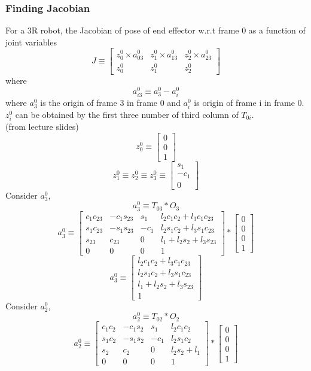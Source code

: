\documentclass[12pt]{article}
\newcommand{\fromlectures}{{\\ \color{blue} \hspace*{\fill}(from lecture slides)} \\}
\begin{document}
\subsubsection*{Finding Jacobian}
For a 3R robot, the Jacobian of pose of end effector w.r.t frame 0 as a function of joint variables
\[
  J \equiv
  \begin{bmatrix} z_0^0 \times a_{03}^0 & z_1^0 \times a_{13}^0 & z_2^0 \times a_{23}^0 \\ z_0^0 & z_1^0 & z_2^0 \end{bmatrix}
\]
where
\[
  a_{i3}^{0} \equiv a_{3}^{0} - a_{i}^{0}
\]
where $a_3^0$ is the origin of frame 3 in frame 0 and $a_i^0$ is origin of frame i in frame 0.
$z_i^0$ can be obtained by the first three number of third column of $T_{0i}$.
\fromlectures
\[
  z_0^{0} \equiv \begin{bmatrix} 0 \\ 0 \\ 1 \end{bmatrix}
\]
\[
  z_1^{0} \equiv z_2^{0} \equiv z_3^{0} \equiv \begin{bmatrix} s_1 \\ -c_1 \\ 0 \end{bmatrix}
\]
Consider $a_{3}^{0}$,
\[
  a_3^0 \equiv T_{03} * O_3
\]
\[
  a_3^0 \equiv
  \begin{bmatrix}
    c_1c_{23} & -c_1s_{23} & s_1  & l_2c_1c_2 + l_3c_1c_{23} \\
    s_1c_{23} & -s_1s_{23} & -c_1 & l_2s_1c_2 + l_3s_1c_{23} \\
    s_{23}    & c_{23}     & 0    & l_1 + l_2s_2 + l_3s_{23} \\
    0 & 0 & 0 & 1
  \end{bmatrix}
  *
  \begin{bmatrix}
    0 \\
    0 \\
    0 \\
    1
  \end{bmatrix}
\]
\[
  a_3^0 \equiv
  \begin{bmatrix}
    l_2c_1c_2 + l_3c_1c_{23} \\
    l_2s_1c_2 + l_3s_1c_{23} \\
    l_1 + l_2s_2 + l_3s_{23} \\
    1
  \end{bmatrix}
\]
Consider $a_{2}^{0}$,
\[
  a_2^0 \equiv T_{02} * O_2
\]
\[
  a_2^0 \equiv
  \begin{bmatrix}
    c_1c_2 & -c_1s_2 & s_1 & l_2c_1c_2 \\
    s_1c_2 & -s_1s_2 & -c_1 & l_2s_1c_2 \\
    s_2 & c_2 & 0 & l_2s_2 + l_1 \\
    0 & 0 & 0 & 1
  \end{bmatrix}
  *
  \begin{bmatrix}
    0 \\
    0 \\
    0 \\
    1
  \end{bmatrix}
\]
\end{document}

